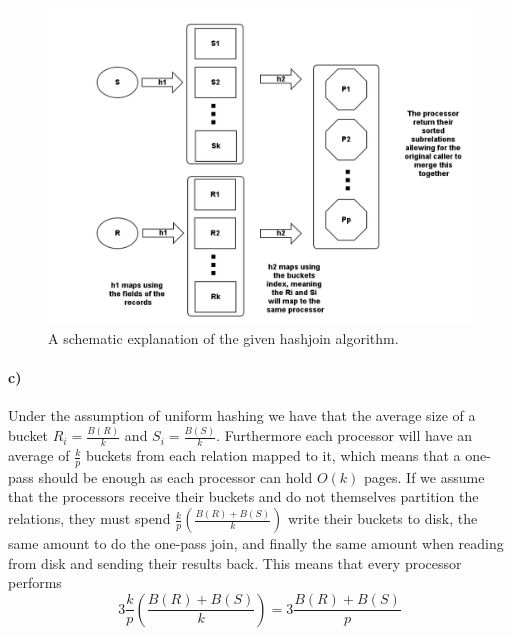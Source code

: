 \documentclass[a4paper, 11pt]{article}
\begin{document}
\begin{figure}[H]
  \centering
  \includegraphics[width=1\textwidth]{hashjoin.png}
  \caption{A schematic explanation of the given hashjoin algorithm.}
  \label{fig:hashjoin}
\end{figure}


\paragraph{c)} %

Under the assumption of uniform hashing we have that the average size of a bucket $R_i = \frac{B(R)}{k}$ and $S_i = \frac{B(S)}{k}$. Furthermore each processor will have an average of $\frac{k}{p}$ buckets from each relation mapped to it, which means that a one-pass should be enough as each processor can hold $O(k)$ pages. If we assume that the processors receive their buckets and do not themselves partition the relations, they must spend $\frac{k}{p} (\frac{B(R) + B(S)}{k})$ write their buckets to disk, the same amount to do the one-pass join, and finally the same amount when reading from disk and sending their results back. This means that every processor performs
\[
    3 \frac{k}{p} \left(\frac{B(R) + B(S)}{k}\right) = 3 \frac{B(R) + B(S)}{p}
\]


\end{document}

